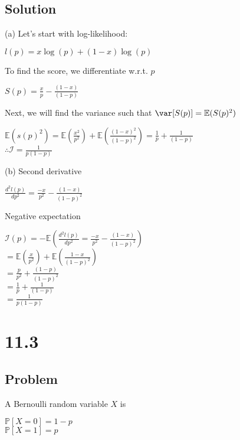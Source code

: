 \documentclass[10pt, a4paper]{article}
\newcommand{\PP}{\mathbb P}
\begin{document}
    \subsection*{Solution}
      (a) Let's start with log-likelihood:
      \begin{center}
        $l(p) = x\log(p)+(1-x)\log(p)$
      \end{center}
      To find the score, we differentiate w.r.t. $p$
      \begin{center}
        $S(p)=\frac{x}{p}-\frac{(1-x)}{(1-p)}$
      \end{center}
      Next, we will find the variance such that $\var[S(p)]=\mathbb{E}(S(p)^2)$
      \begin{center}
        $\mathbb{E}(s(p)^2)=\mathbb{E}(\frac{x^2}{p^2})+\mathbb{E}(\frac{(1-x)^2}{(1-p)^2}) = \frac{1}{p}+\frac{1}{(1-p)}$\\
        $\boxed{\therefore \mathcal{I} = \frac{1}{p(1-p)}}$
      \end{center}
      (b) Second derivative 
      \begin{center}
        $\frac{d^2l(p)}{dp^2}=\frac{-x}{p^2}-\frac{(1-x)}{(1-p)^2}$ \\
      \end{center}
      Negative expectation
      \begin{center}
        $\mathcal{I}(p)=-\mathbb{E}(\frac{d^2l(p)}{dp^2}=\frac{-x}{p^2}-\frac{(1-x)}{(1-p)^2})$\\
        $ = \mathbb{E}(\frac{x}{p^2})+\mathbb{E}(\frac{1-x}{(1-p)^2})$ \\
        $ = \frac{p}{p^2}+\frac{(1-p)}{(1-p)^2}$ \\
        $ = \frac{1}{p}+\frac{1}{(1-p)}$ \\
        $\boxed{ = \frac{1}{p(1-p)}}$ 
      \end{center}
  \section*{11.3}
    \subsection*{Problem}
      A Bernoulli random variable $X$ is
      \begin{center}
        $\PP[X=0]=1-p$ \\
        $\PP[X=1]=p$ \\
      \end{center}
\end{document}
